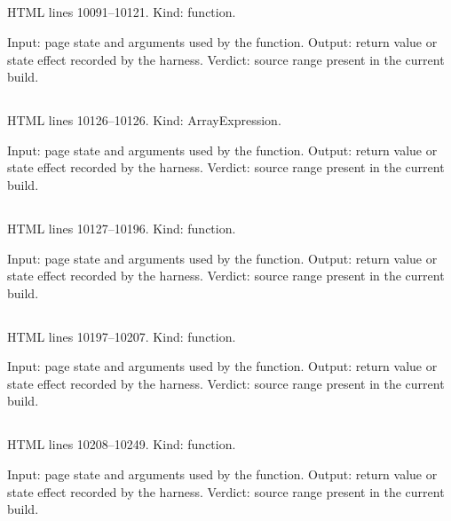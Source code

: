 \subsection*{\texttt{}}
\label{vf_559_wireQualityReview}
HTML lines 10091--10121. Kind: function.

Input: page state and arguments used by the function.
Output: return value or state effect recorded by the harness.
Verdict: source range present in the current build.

\subsection*{\texttt{}}
\label{vf_560_STAGED}
HTML lines 10126--10126. Kind: ArrayExpression.

Input: page state and arguments used by the function.
Output: return value or state effect recorded by the harness.
Verdict: source range present in the current build.

\subsection*{\texttt{}}
\label{vf_561_intake}
HTML lines 10127--10196. Kind: function.

Input: page state and arguments used by the function.
Output: return value or state effect recorded by the harness.
Verdict: source range present in the current build.

\subsection*{\texttt{}}
\label{vf_562_readStaged}
HTML lines 10197--10207. Kind: function.

Input: page state and arguments used by the function.
Output: return value or state effect recorded by the harness.
Verdict: source range present in the current build.

\subsection*{\texttt{}}
\label{vf_563_readStagedCore}
HTML lines 10208--10249. Kind: function.

Input: page state and arguments used by the function.
Output: return value or state effect recorded by the harness.
Verdict: source range present in the current build.

